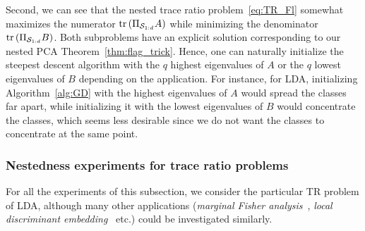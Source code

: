Second, we can see that the nested trace ratio problem~\eqref{eq:TR_Fl} somewhat maximizes the numerator $\operatorname{tr}\left(\Pi_{\mathcal{S}_{1:d}} A\right)$ while minimizing the denominator $\operatorname{tr}\left(\Pi_{\mathcal{S}_{1:d}} B\right)$. Both subproblems have an explicit solution corresponding to our nested PCA Theorem~\ref{thm:flag_trick}. Hence, one can naturally initialize the steepest descent algorithm with the $q$ highest eigenvalues of $A$ or the $q$ lowest eigenvalues of $B$ depending on the application.
For instance, for LDA, initializing Algorithm~\ref{alg:GD} with the highest eigenvalues of $A$ would spread the classes far apart, while initializing it with the lowest eigenvalues of $B$ would concentrate the classes, which seems less desirable since we do not want the classes to concentrate at the same point.

\subsubsection{Nestedness experiments for trace ratio problems}
For all the experiments of this subsection, we consider the particular TR problem of LDA, although many other applications (\textit{marginal Fisher analysis}~\citep{yan_graph_2007}, \textit{local discriminant embedding}~\citep{chen_local_2005} etc.) could be investigated similarly.


